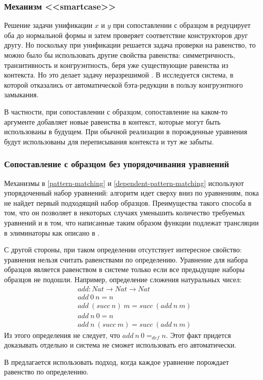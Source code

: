 \label{dependent-pattern-matching-extensions}
\subsubsection{Механизм <<smartcase>>}

Решение задачи унификации \(x\) и \(y\) при сопоставлении с образцом в
\cite{dependent-pattern-matching} редуцирует оба до нормальной формы и затем
проверяет соответствие конструкторов друг другу. Но поскольку при унификации
решается задача проверки на равенство, то можно было бы использовать другие
свойства равенства: симметричность, транзитивность и конгруэнтность, беря уже
существующие равенства из контекста. Но это делает задачу неразрешимой
\cite{programming-up-to-congruence}. В \cite{programming-up-to-congruence}
исследуется система, в которой отказались от автоматической бэта-редукции в
пользу конгруэнтного замыкания.

В частности, при сопоставлении с образцом, сопоставление на каком-то аргументе
добавляет новые равенства в контекст, которые могут быть использованы в будущем.
При обычной реализации в \cite{dependent-pattern-matching} порожденные уравнения
будут использованы для переписывания контекста и тут же забыты.

\subsubsection{Сопоставление с образцом без упорядочивания уравнений}

Механизмы в \ref{pattern-matching} и \ref{dependent-pattern-matching} используют
упорядоченный набор уравнений: алгоритм идет сверху вниз по уравнениям, пока не
найдет первый подходящий набор образцов. Преимущества такого способа в том,
что он позволяет в некоторых случаях уменьшить количество требуемых уравнений
\cite{overlapping-and-order-independent-patterns} и в том, что написанные таким
образом функции подлежат трансляции в элиминаторы как описано в
\cite{eliminating-dependent-pattern-matching}.

С другой стороны, при таком определении отсутствует интересное свойство:
уравнения нельзя считать равенствами по определению. Уравнение для набора
образцов является равенством в системе только если все предыдущие наборы
образцов не подошли. Например, определение сложения натуральных чисел:
\begin{align*}
&add : Nat \to Nat \to Nat\\
&add\ 0\ n = n\\
&add\ (succ\ n)\ m = succ\ (add\ n\ m)\\
&add\ n\ 0 = n\\
&add\ n\ (succ\ m) = succ\ (add\ n\ m)
\end{align*}
Из этого определения не следует, что \(add\ n\ 0 =_{def} n\). Этот факт придется
доказывать отдельно и система не сможет использовать его автоматически.

В \cite{overlapping-and-order-independent-patterns} предлагается использовать
подход, когда каждое уравнение порождает равенство по определению.
